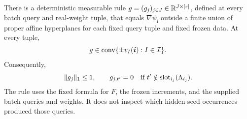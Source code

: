 \begin{lemma}
\label{ana:gradient}
There is a deterministic measurable rule
\(g=(g_j)_{j\in J}\in\mathbb R^{J\times[r]}\), defined at every batch
query and real-weight tuple, that equals
\(\nabla\psi_{\boldsymbol i}\) outside a finite union of proper
affine hyperplanes for each fixed query tuple and fixed frozen
data. At every tuple,
\begin{equation}
 g\in\operatorname{conv}\{\pm v_I(\boldsymbol i):I\in\mathcal I\}.
 \label{ana:hull}
\end{equation}
Consequently,
\begin{equation}
 \|g_j\|_1\leq1,
 \qquad
 g_{j,t'}=0\quad\hbox{if }t'\notin
                   \operatorname{slot}_{i_j}(\Lambda_{i_j}).
 \label{ana:block-bound}
\end{equation}
The rule uses the fixed formula for \(F\), the frozen increments,
and the supplied batch queries and weights. It does not inspect
which hidden seed occurrences produced those queries.
\end{lemma}

